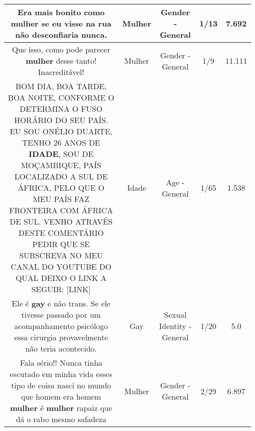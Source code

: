 \documentclass[11pt]{article}
\newlength\mylength
\begin{document}
\begin{center}
\begin{longtable}{|C{.65\mylength}|C{.30\mylength}|C{.12\mylength}|C{.12\mylength}|C{.12\mylength}|}
  \small Era mais bonito como \textbf{mulher} se eu visse na rua não desconfiaria nunca.\normalsize   & Mulher & Gender - General & 1/13 & 7.692 \\  \hline
  \small Que isso, como pode parecer \textbf{mulher} desse tanto! Inacreditável!\normalsize   & Mulher & Gender - General & 1/9 & 11.111 \\  \hline
  \small BOM DIA, BOA TARDE, BOA NOITE, CONFORME O DETERMINA O FUSO HORÁRIO DO SEU PAÍS. EU SOU ONÉLIO DUARTE, TENHO 26 ANOS DE \textbf{IDADE}, SOU DE MOÇAMBIQUE, PAÍS LOCALIZADO A SUL DE ÁFRICA, PELO QUE O MEU PAÍS FAZ FRONTEIRA COM ÁFRICA DE SUL. VENHO ATRAVÉS DESTE COMENTÁRIO PEDIR QUE SE SUBSCREVA NO MEU CANAL DO YOUTUBE DO QUAL DEIXO O LINK A SEGUIR:  [LINK] \normalsize   & Idade & Age - General & 1/65 & 1.538 \\  \hline
  \small Ele é \textbf{gay} e não trans. Se ele tivesse passado por um acompanhamento psicólogo essa cirurgia provavelmente não teria acontecido.\normalsize   & Gay & Sexual Identity - General & 1/20 & 5.0 \\  \hline
  \small Fala sério!! Nunca tinha escutado em minha vida esses tipo de coisa  nasci no mundo que homem era homem \textbf{mulher} é \textbf{mulher}  rapaiz que dá o rabo mesmo safadeza\normalsize   & Mulher & Gender - General & 2/29 & 6.897 \\  \hline

\end{longtable}
\end{center}
\end{document}
